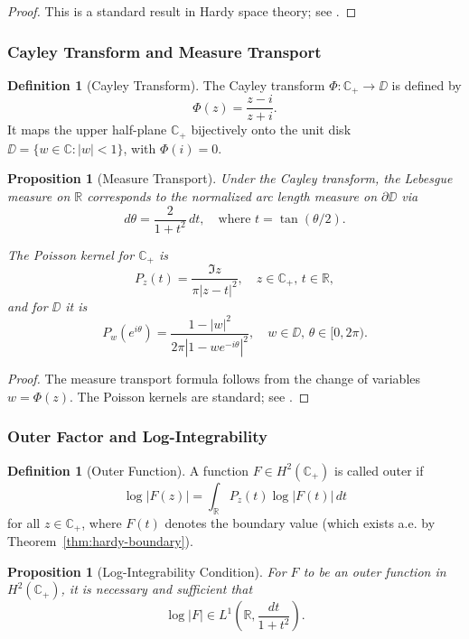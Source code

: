 ﻿\documentclass[12pt,a4paper]{article}
\newtheorem{proposition}[theorem]{Proposition}
\theoremstyle{definition}
\newtheorem{definition}[theorem]{Definition}
\theoremstyle{remark}
\newcommand{\CC}{\mathbb{C}}
\newcommand{\RR}{\mathbb{R}}
\begin{document}
\begin{proof}
This is a standard result in Hardy space theory; see \cite[Thm.~2.2]{Garnett2007}.
\end{proof}

\subsubsection{Cayley Transform and Measure Transport}

\begin{definition}[Cayley Transform]
\label{def:cayley-transform}
The Cayley transform $\Phi : \CC_+ \to \DD$ is defined by
\[
\Phi(z) = \frac{z - i}{z + i}.
\]
It maps the upper half-plane $\CC_+$ bijectively onto the unit disk $\DD = \{w \in \CC : |w| < 1\}$, with $\Phi(i) = 0$.
\end{definition}

\begin{proposition}[Measure Transport]
\label{prop:cayley-measure}
Under the Cayley transform, the Lebesgue measure on $\RR$ corresponds to the normalized arc length measure on $\partial\DD$ via
\[
d\theta = \frac{2}{1 + t^2} \, dt, \quad \text{where } t = \tan(\theta/2).
\]

The Poisson kernel for $\CC_+$ is
\[
P_z(t) = \frac{\Im z}{\pi |z - t|^2}, \quad z \in \CC_+, \, t \in \RR,
\]
and for $\DD$ it is
\[
P_w(e^{i\theta}) = \frac{1 - |w|^2}{2\pi |1 - w e^{-i\theta}|^2}, \quad w \in \DD, \, \theta \in [0, 2\pi).
\]
\end{proposition}

\begin{proof}
The measure transport formula follows from the change of variables $w = \Phi(z)$. The Poisson kernels are standard; see \cite[Chap.~1]{Garnett2007}.
\end{proof}

\subsubsection{Outer Factor and Log-Integrability}

\begin{definition}[Outer Function]
\label{def:outer-function}
A function $F \in H^2(\CC_+)$ is called outer if
\[
\log|F(z)| = \int_\RR P_z(t) \log|F(t)| \, dt
\]
for all $z \in \CC_+$, where $F(t)$ denotes the boundary value (which exists a.e. by Theorem~\ref{thm:hardy-boundary}).
\end{definition}

\begin{proposition}[Log-Integrability Condition]
\label{prop:log-integrable}
For $F$ to be an outer function in $H^2(\CC_+)$, it is necessary and sufficient that
\[
\log|F| \in L^1\left(\RR, \frac{dt}{1 + t^2}\right).
\]
\end{proposition}
\end{document}
